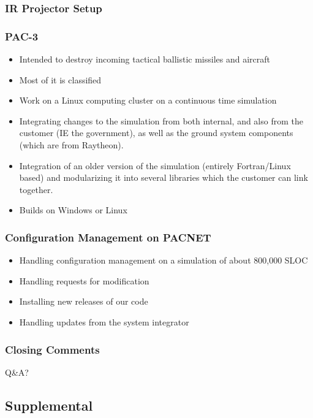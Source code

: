 \documentclass[aspectratio=169]{beamer}
\begin{document}
\begin{frame}
  \frametitle{IR Projector Setup}
\end{frame}


\begin{frame}
  \frametitle{PAC-3} %
  \begin{itemize}
  \item Intended to destroy incoming tactical ballistic missiles and aircraft
  \item Most of it is classified
  \item Work on a Linux computing cluster on a continuous time simulation
  \item Integrating changes to the simulation from both internal, and also from the customer (IE the government), as well as the ground system components (which are from Raytheon).
  \item Integration of an older version of the simulation (entirely Fortran/Linux based) and modularizing it into several libraries which the customer can link together.
  \item Builds on Windows or Linux
  \end{itemize}
\end{frame}

\begin{frame}
  \frametitle{Configuration Management on PACNET}
  \begin{itemize}
  \item Handling configuration management on a simulation of about 800,000 SLOC
  \item Handling requests for modification
  \item Installing new releases of our code
  \item Handling updates from the system integrator
  \end{itemize}
\end{frame}

\begin{frame}
  \frametitle{Closing Comments}

\end{frame}

\begin{frame}
\Huge{\centerline{Q\&A?}}
\end{frame}

\subsection{Supplemental}
\end{document}
